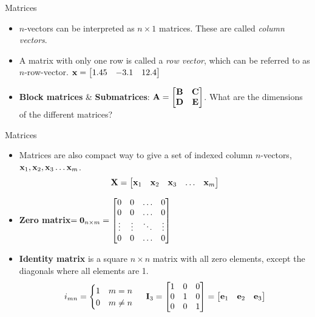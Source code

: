 \documentclass[aspectratio=169]{beamer}
\let\olditem\item
\renewcommand{\item}{\setlength{\itemsep}{\fill}\olditem}
\def\mf{\ensuremath\mathbf}
\begin{document}
\begin{frame}[t]{Matrices}
\begin{itemize}
    \item $n$-vectors can be interpreted as $n \times 1$ matrices. These are called \textit{column vectors}.
    \item A matrix with only one row is called a \textit{row vector}, which can be referred to as $n$-row-vector.  $\mf{x} = \begin{bmatrix}1.45 & -3.1 & 12.4\end{bmatrix}$
    \item\textbf{Block matrices} \& \textbf{Submatrices}: $\mf{A} = \begin{bmatrix}
    \mf{B} & \mf{C} \\
    \mf{D} & \mf{E}
    \end{bmatrix}$.  What are the dimensions of the different matrices?
\end{itemize}
\end{frame}


\begin{frame}[t]{Matrices}
\begin{itemize}
    \item Matrices are also compact way to give a set of indexed column $n$-vectors, 
    $\mf{x}_1, \mf{x}_2, \mf{x}_3 \ldots \mf{x}_m$. 
    $$\mf{X} = \begin{bmatrix}
    \mf{x}_1 & \mf{x}_2 & \mf{x}_3 & \ldots & \mf{x}_m
    \end{bmatrix}$$

    \item \textbf{Zero matrix}$ = \mf{0}_{n\times m} = \begin{bmatrix}
    0 & 0 & \ldots & 0\\
    0 & 0 & \ldots & 0\\
    \vdots & \vdots & \ddots & \vdots\\
    0 & 0 & \ldots & 0
    \end{bmatrix}$

    \item \textbf{Identity matrix} is a square $n \times n$ matrix with all zero elements, except the diagonals where all elements are 1.
    $$i_{mn} = \begin{cases}
    1 & m = n\\
    0 & m \neq n
    \end{cases} \,\,\,\,\,\,\,\, \mf{I}_3=\begin{bmatrix}
    1 & 0 & 0\\
    0 & 1 & 0\\
    0 & 0 & 1\\
    \end{bmatrix} = \begin{bmatrix}
    \mf{e}_1 & \mf{e}_2 & \mf{e}_3
    \end{bmatrix}$$
\end{itemize}
\end{frame}
\end{document}
